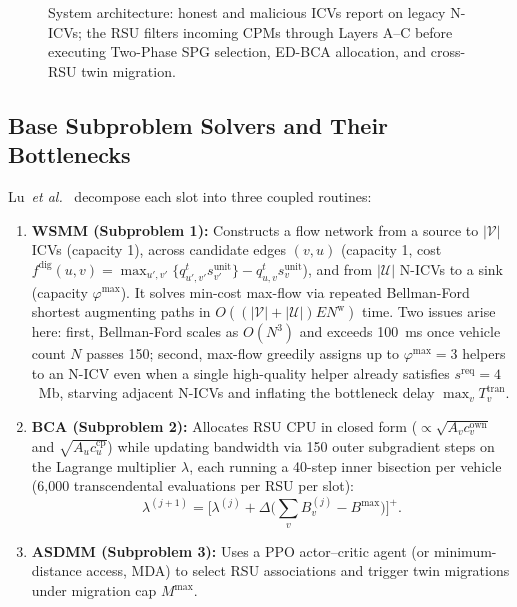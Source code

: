 \documentclass[conference]{IEEEtran}
\begin{document}
\begin{figure}[t]
\caption{System architecture: honest and malicious ICVs report on legacy N-ICVs; the RSU filters incoming CPMs through Layers A--C before executing Two-Phase SPG selection, ED-BCA allocation, and cross-RSU twin migration.}
\label{fig:system}
\end{figure}

\subsection{Base Subproblem Solvers and Their Bottlenecks}
Lu~\textit{et al.}~\cite{lu2025} decompose each slot into three coupled routines:
\begin{enumerate}
\item \textbf{WSMM (Subproblem 1):} Constructs a flow network from a source to $|\mathcal{V}|$ ICVs (capacity 1), across candidate edges $(v,u)$ (capacity 1, cost $f^{\mathrm{dig}}(u,v) = \max_{u',v'}\{q^t_{u',v'}s^{\mathrm{unit}}_{v'}\} - q^t_{u,v}s^{\mathrm{unit}}_v$), and from $|\mathcal{U}|$ N-ICVs to a sink (capacity $\varphi^{\max}$). It solves min-cost max-flow via repeated Bellman-Ford shortest augmenting paths in $O((|\mathcal{V}|+|\mathcal{U}|)E N^{\mathrm{w}})$ time. Two issues arise here: first, Bellman-Ford scales as $O(N^3)$ and exceeds 100~ms once vehicle count $N$ passes 150; second, max-flow greedily assigns up to $\varphi^{\max}=3$ helpers to an N-ICV even when a single high-quality helper already satisfies $s^{\mathrm{req}}=4$~Mb, starving adjacent N-ICVs and inflating the bottleneck delay $\max_v T^{\mathrm{tran}}_v$.
\item \textbf{BCA (Subproblem 2):} Allocates RSU CPU in closed form ($\propto \sqrt{A_v c^{\mathrm{own}}_v}$ and $\sqrt{A_u c^{\mathrm{cp}}_u}$) while updating bandwidth via 150 outer subgradient steps on the Lagrange multiplier $\lambda$, each running a 40-step inner bisection per vehicle (6,000 transcendental evaluations per RSU per slot):
\begin{equation}
\lambda^{(j+1)}=\Big[\lambda^{(j)}+\Delta\Big(\sum_vB^{(j)}_v-B^{\max}\Big)\Big]^{+}.
\label{eq:dual}
\end{equation}
\item \textbf{ASDMM (Subproblem 3):} Uses a PPO actor--critic agent (or minimum-distance access, MDA) to select RSU associations and trigger twin migrations under migration cap $M^{\max}$.
\end{enumerate}
\end{document}

